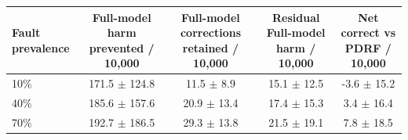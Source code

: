 \begin{tabular}{lcccc}
\toprule
Fault prevalence & Full-model harm prevented / 10,000 & Full-model corrections retained / 10,000 & Residual Full-model harm / 10,000 & Net correct vs PDRF / 10,000 \\
\midrule
10\% & 171.5 $\pm$ 124.8 & 11.5 $\pm$ 8.9 & 15.1 $\pm$ 12.5 & -3.6 $\pm$ 15.2 \\
40\% & 185.6 $\pm$ 157.6 & 20.9 $\pm$ 13.4 & 17.4 $\pm$ 15.3 & 3.4 $\pm$ 16.4 \\
70\% & 192.7 $\pm$ 186.5 & 29.3 $\pm$ 13.8 & 21.5 $\pm$ 19.1 & 7.8 $\pm$ 18.5 \\
\bottomrule
\end{tabular}
